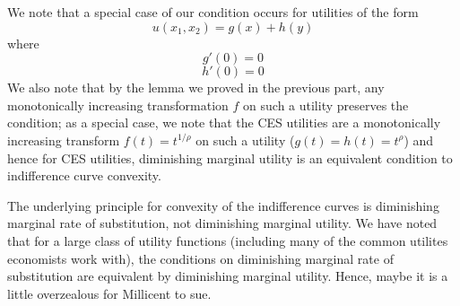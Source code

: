 \documentclass[10pt,letter]{article}
\begin{document}
We note that a special case of our condition occurs for utilities of the form
\[ u(x_1, x_2) = g(x) + h(y)\]
where
\[ g'(0) = 0 \]
\[ h'(0) = 0 \]
We also note that by the lemma we proved in the previous part, any monotonically increasing transformation $f$ on such a utility preserves the condition; as a special case, we note that the CES utilities are a monotonically increasing transform $f(t) = t^{1/\rho}$ on such a utility ($g(t) = h(t) = t^\rho$) and hence for CES utilities, diminishing marginal utility is an equivalent condition to indifference curve convexity.

The underlying principle for convexity of the indifference curves is diminishing marginal rate of substitution, not diminishing marginal utility. We have noted that for a large class of utility functions (including many of the common utilites economists work with), the conditions on diminishing marginal rate of substitution are equivalent by diminishing marginal utility. Hence, maybe it is a little overzealous for Millicent to sue.
\end{document}
